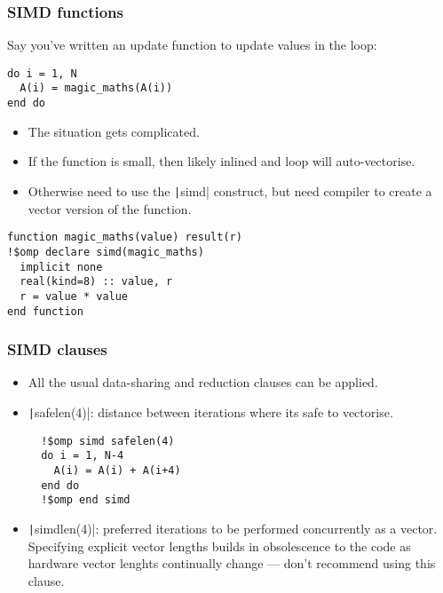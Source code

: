 \documentclass[aspectratio=169]{beamer}
\begin{document}
\begin{frame}[fragile]
\frametitle{SIMD functions}
Say you've written an update function to update values in the loop:
\begin{verbatim}
do i = 1, N
  A(i) = magic_maths(A(i))
end do
\end{verbatim}

\begin{itemize}
  \item The situation gets complicated.
  \item If the function is small, then likely inlined and loop will auto-vectorise.
  \item Otherwise need to use the \texttt|simd| construct, but need compiler to create a vector version of the function.
\end{itemize}

\begin{verbatim}
function magic_maths(value) result(r)
!$omp declare simd(magic_maths)
  implicit none
  real(kind=8) :: value, r
  r = value * value
end function
\end{verbatim}

\end{frame}

\begin{frame}[fragile]
\frametitle{SIMD clauses}
\begin{itemize}
  \item All the usual data-sharing and reduction clauses can be applied.
  \item \texttt|safelen(4)|: distance between iterations where its safe to vectorise.
  \begin{verbatim}
  !$omp simd safelen(4)
  do i = 1, N-4
    A(i) = A(i) + A(i+4)
  end do
  !$omp end simd
  \end{verbatim}
  \item \texttt|simdlen(4)|: preferred iterations to be performed concurrently as a vector.
  Specifying explicit vector lengths builds in obsolescence to the code as hardware vector lenghts continually change --- don't recommend using this clause.
\end{itemize}
\end{frame}
\end{document}
